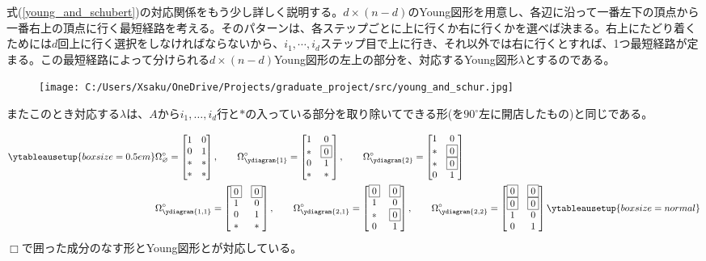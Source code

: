 \documentclass{ltjsreport}
\begin{document}
式(\ref{young_and_schubert})の対応関係をもう少し詳しく説明する。$d\times (n-d)$のYoung図形を用意し、各辺に沿って一番左下の頂点から一番右上の頂点に行く最短経路を考える。そのパターンは、各ステップごとに上に行くか右に行くかを選べば決まる。右上にたどり着くためには$d$回上に行く選択をしなければならないから、$i_1,\cdots,i_d$ステップ目で上に行き、それ以外では右に行くとすれば、1つ最短経路が定まる。この最短経路によって分けられる$d\times(n-d)$Young図形の左上の部分を、対応するYoung図形$\lambda$とするのである。
\begin{figure}[H]
  \centering
  \texttt{[image: C:/Users/Xsaku/OneDrive/Projects/graduate\_project/src/young\_and\_schur.jpg]}
\end{figure}
またこのとき対応する$\lambda$は、$A$から$i_1,\dots,i_d$行と$*$の入っている部分を取り除いてできる形(を$90^\circ$左に開店したもの)と同じである。



\begin{eg}
\begin{align*}
  \ytableausetup{boxsize=0.5em}
  &\Omega^\circ_{\varnothing}=\bmat{
    1 & 0\\
    0 & 1\\
    * & *\\
    * & *
  },\qquad 
  \Omega^\circ_{\ydiagram{1}}=\bmat{
    1 & 0\\
    * & \fbox{0}\\
    0 & 1\\
    * & *
  },\qquad
  \Omega^\circ_{\ydiagram{2}}=\bmat{
    1 & 0\\
    * & \fbox{0}\\
    * & \fbox{0}\\
    0 & 1
  }\\
  &\Omega^\circ_{\ydiagram{1,1}}=\bmat{
    \fbox{0} & \fbox{0}\\
    1 & 0\\
    0 & 1\\
    * & *
  },\qquad
  \Omega^\circ_{\ydiagram{2,1}}=\bmat{
    \fbox{0} & \fbox{0}\\
    1 & 0\\
    * & \fbox{0}\\
    0 & 1
  },\qquad
  \Omega^\circ_{\ydiagram{2,2}}=\bmat{
    \fbox{0} & \fbox{0}\\
    \fbox{0} & \fbox{0}\\
    1 & 0\\
    0 & 1
  }
  \ytableausetup{boxsize=normal}
\end{align*}
$\Box$で囲った成分のなす形とYoung図形とが対応している。
\end{eg}
\end{document}
